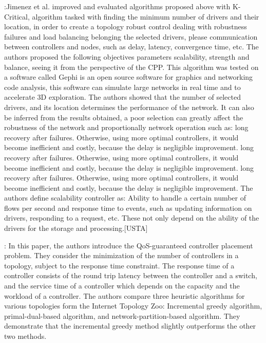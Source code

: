 \documentclass[a4paper,10pt]{article}
\begin{document}
\cite{JiCe14}:Jimenez et al. improved and evaluated algorithms proposed above with K-Critical, algorithm tasked with finding the minimum number of drivers and their location, in order to create a topology robust control dealing with robustness failures and load balancing belonging the selected drivers, please communication between controllers and nodes, such as delay, latency, convergence time, etc. The authors proposed the following objectives parameters scalability, strength and balance, seeing it from the perspective of the CPP. This algorithm was tested on a software called Gephi is an open source software for graphics and networking code analysis, this software can simulate large networks in real time and to accelerate 3D exploration. The authors showed that the number of selected drivers, and its location determines the performance of the network. It can also be inferred from the results obtained, a poor selection can greatly affect the robustness of the network and proportionally network operation such as: long recovery after failures. Otherwise, using more optimal controllers, it would become inefficient and costly, because the delay is negligible improvement. long recovery after failures. Otherwise, using more optimal controllers, it would become inefficient and costly, because the delay is negligible improvement. long recovery after failures. Otherwise, using more optimal controllers, it would become inefficient and costly, because the delay is negligible improvement.
The authors define scalability controller as: Ability to handle a certain number of flows per second and response time to events, such as updating information on drivers, responding to a request, etc. These not only depend on the ability of the drivers for the storage and processing.[USTA]




\cite{ChWa15}: In this paper, the authors introduce the QoS-guaranteed controller placement problem. They consider the minimization of the number of controllers in a topology, subject to the response time constraint. The response time of a controller consists of the round trip latency between the controller and a switch, and the service time of a controller which depends on the capacity and the workload of a controller. The authors compare three heuristic algorithms for various topologies form the Internet Topology Zoo: Incremental greedy algorithm, primal-dual-based algorithm, and network-partition-based algorithm. They demonstrate that the incremental greedy method slightly outperforms the other two methods.
\end{document}

